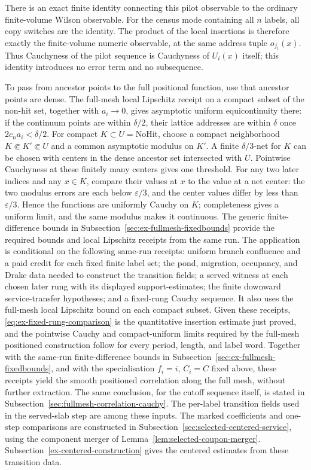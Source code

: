 There is an exact finite identity connecting this pilot observable to the
ordinary finite-volume Wilson observable. For the census mode containing all
$n$ labels, all copy switches are the identity. The product of the local
insertions is therefore exactly the finite-volume numeric observable, at the
same address tuple $o_{f_i}(x)$. Thus Cauchyness of the pilot sequence is
Cauchyness of $U_i(x)$ itself; this identity introduces no error term and no
subsequence.

To pass from ancestor points to the full positional function, use that
ancestor points are dense. The full-mesh local Lipschitz receipt on a compact
subset of the non-hit set, together with $a_i\to0$, gives asymptotic
uniform equicontinuity there: if the continuum points are within $\delta/2$,
their lattice addresses are within $\delta$ once $2c_n a_i<\delta/2$.
For compact $K\subset U=\mathrm{NoHit}$, choose a compact neighborhood
$K\Subset K\prime\Subset U$ and a common asymptotic modulus on $K\prime$.
A finite $\delta/3$-net for $K$ can be chosen with centers in the dense
ancestor set intersected with $U$. Pointwise Cauchyness at these finitely
many centers gives one threshold. For any two later indices and any $x\in K$,
compare their values at $x$ to the value at a net center: the two modulus
errors are each below $\varepsilon/3$, and the center values differ by
less than $\varepsilon/3$. Hence the functions are uniformly Cauchy on $K$;
completeness gives a uniform limit, and the same modulus makes it continuous.
The generic finite-difference bounds in Subsection~\ref{sec:ex-fullmesh-fixedbounds}
provide the required bounds and local Lipschitz receipts from the same run.
The application is conditional on the following same-run receipts: uniform
branch confluence and a paid credit for each fixed finite label set; the
pond, migration, occupancy, and Drake data needed to construct the transition
fields; a served witness at each chosen later rung with its displayed
support-estimates; the finite downward service-transfer hypotheses; and a
fixed-rung Cauchy sequence. It also uses the full-mesh local Lipschitz bound
on each compact subset. Given these receipts, \eqref{eq:ex-fixed-rung-comparison} is the quantitative
insertion estimate just proved, and the pointwise Cauchy and compact-uniform
limits required by the full-mesh positioned construction follow for every
period, length, and label word.
Together with the same-run finite-difference bounds in
Subsection~\ref{sec:ex-fullmesh-fixedbounds}, and with the specialisation
$f_i=i$, $C_i=C$ fixed above, these receipts yield the smooth
positioned correlation along the full mesh, without further extraction.
The same conclusion, for the cutoff sequence itself, is stated in
Subsection~\ref{sec:fullmesh-correlation-cauchy}.
The per-label transition fields used in the served-slab step are among
these inputs. The marked coefficients and one-step comparisons are
constructed in Subsection~\ref{sec:selected-centered-service}, using
the component merger of Lemma~\ref{lem:selected-coupon-merger}.
Subsection~\ref{ex-centered-construction} gives the centered estimates
from these transition data.
